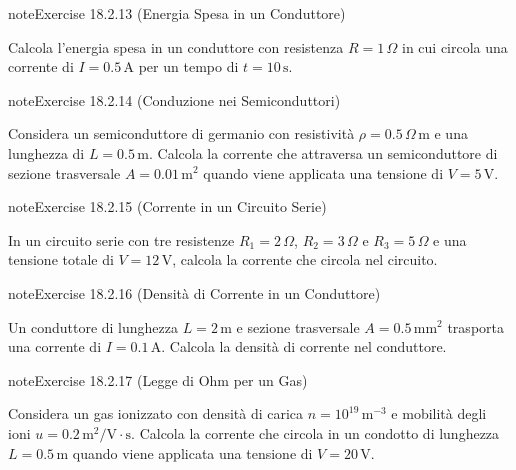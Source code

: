 \documentclass[letterpaper,10pt,italian]{jupyterBook}
\begin{document}
\begin{sphinxadmonition}{note}{Exercise 18.2.13 (Energia Spesa in un Conduttore)}



\sphinxAtStartPar
Calcola l’energia spesa in un conduttore con resistenza \(R = 1 \, \Omega\) in cui circola una corrente di \(I = 0.5 \, \text{A}\) per un tempo di \(t = 10 \, \text{s}\).
\end{sphinxadmonition}
 \label{exercise:ch/electromagnetism/electric-current-problems-exercise-13}

\begin{sphinxadmonition}{note}{Exercise 18.2.14 (Conduzione nei Semiconduttori)}



\sphinxAtStartPar
Considera un semiconduttore di germanio con resistività \(\rho = 0.5 \, \Omega \, \text{m}\) e una lunghezza di \(L = 0.5 \, \text{m}\). Calcola la corrente che attraversa un semiconduttore di sezione trasversale \(A = 0.01 \, \text{m}^2\) quando viene applicata una tensione di \(V = 5 \, \text{V}\).
\end{sphinxadmonition}
 \label{exercise:ch/electromagnetism/electric-current-problems-exercise-14}

\begin{sphinxadmonition}{note}{Exercise 18.2.15 (Corrente in un Circuito Serie)}



\sphinxAtStartPar
In un circuito serie con tre resistenze \(R_1 = 2 \, \Omega\), \(R_2 = 3 \, \Omega\) e \(R_3 = 5 \, \Omega\) e una tensione totale di \(V = 12 \, \text{V}\), calcola la corrente che circola nel circuito.
\end{sphinxadmonition}
 \label{exercise:ch/electromagnetism/electric-current-problems-exercise-15}

\begin{sphinxadmonition}{note}{Exercise 18.2.16 (Densità di Corrente in un Conduttore)}



\sphinxAtStartPar
Un conduttore di lunghezza \(L = 2 \, \text{m}\) e sezione trasversale \(A = 0.5 \, \text{mm}^2\) trasporta una corrente di \(I = 0.1 \, \text{A}\). Calcola la densità di corrente nel conduttore.
\end{sphinxadmonition}
 \label{exercise:ch/electromagnetism/electric-current-problems-exercise-16}

\begin{sphinxadmonition}{note}{Exercise 18.2.17 (Legge di Ohm per un Gas)}



\sphinxAtStartPar
Considera un gas ionizzato con densità di carica \(n = 10^{19} \, \text{m}^{-3}\) e mobilità degli ioni \(u = 0.2 \, \text{m}^2/\text{V} \cdot \text{s}\). Calcola la corrente che circola in un condotto di lunghezza \(L = 0.5 \, \text{m}\) quando viene applicata una tensione di \(V = 20 \, \text{V}\).
\end{sphinxadmonition}
\end{document}
